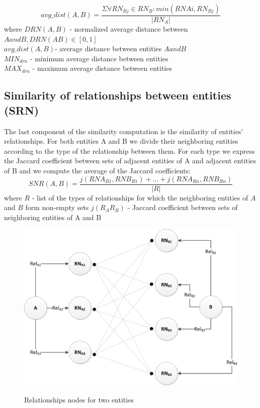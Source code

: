 \documentclass{llncs}
\begin{document}
\begin {equation}
     avg\_dist(A,B)  =\frac {\Sigma \forall RN_{Bj} \in RN_B : min(RN{Ai},RN_{Bj})}{|RN_A|}
\label{rov5}
\end{equation}
where\newline
$DRN(A, B)$ - normalized average distance between $A and B, DRN(A B) \in [0, 1]$\\
$avg\_dist(A, B) $- average distance between entities $A and B$\\
$MIN_{drn}$ - minimum average distance between entities\\
$MAX_{drn}$ - maximum average distance between entities

\subsection{Similarity of relationships between entities (SRN)}
The last component of the similarity computation is the similarity of entities'
relationships. For both entities A and B we divide their neighboring entities
according to the type of the relationship between them. For each type we express
the Jaccard coefficient between sets of adjacent entities of A and adjacent entities
of B and we compute the average of the Jaccard coefficients:
\begin {equation}
SNR(A,B)=\frac {j(RNA_{R1},RNB_{R1})+...+j(RNA_{Rn},RNB_{Rn})}{|R|}
\end {equation}
where\newline
$R$ - list of the types of relationships for which the neighboring entities of $A$ and
$B$ form non-empty sets
$j(R_A R_B)$ - Jaccard coefficient between sets of neighboring entities of A and B
\begin{figure}
\includegraphics[width=1\linewidth]{OBR1.png}
\renewcommand\figurename{Fig}
\label {fig1}
\caption {Relationships nodes for two entities}
\end{figure}
\end{document}
